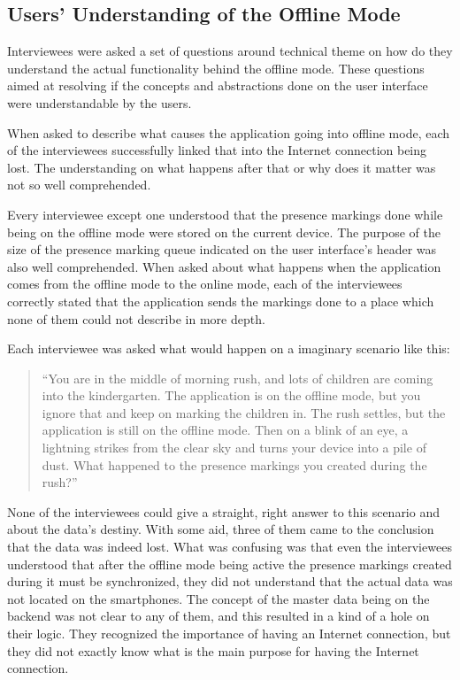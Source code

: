 



\subsection{Users' Understanding of the Offline Mode}
\label{subsec:offline-understanding}

Interviewees were asked a set of questions around technical theme on how do they understand the actual functionality behind the offline mode. These questions aimed at resolving if the concepts and abstractions done on the user interface were understandable by the users. 

When asked to describe what causes the application going into offline mode, each of the interviewees successfully linked that into the Internet connection being lost. The understanding on what happens after that or why does it matter was not so well comprehended. 

Every interviewee except one understood that the presence markings done while being on the offline mode were stored on the current device. The purpose of the size of the presence marking queue indicated on the user interface's header was also well comprehended. When asked about what happens when the application comes from the offline mode to the online mode, each of the interviewees correctly stated that the application sends the markings done to a place which none of them could not describe in more depth.

Each interviewee was asked what would happen on a imaginary scenario like this: 
\begin{quote}
``You are in the middle of morning rush, and lots of children are coming into the kindergarten. The application is on the offline mode, but you ignore that and keep on marking the children in. The rush settles, but the application is still on the offline mode. Then on a blink of an eye, a lightning strikes from the clear sky and turns your device into a pile of dust. What happened to the presence markings you created during the rush?'' 
\end{quote}

None of the interviewees could give a straight, right answer to this scenario and about the data's destiny. With some aid, three of them came to the conclusion that the data was indeed lost. What was confusing was that even the interviewees understood that after the offline mode being active the presence markings created during it must be synchronized, they did not understand that the actual data was not located on the smartphones. The concept of the master data being on the backend was not clear to any of them, and this resulted in a kind of a hole on their logic. They recognized the importance of having an Internet connection, but they did not exactly know what is the main purpose for having the Internet connection.







